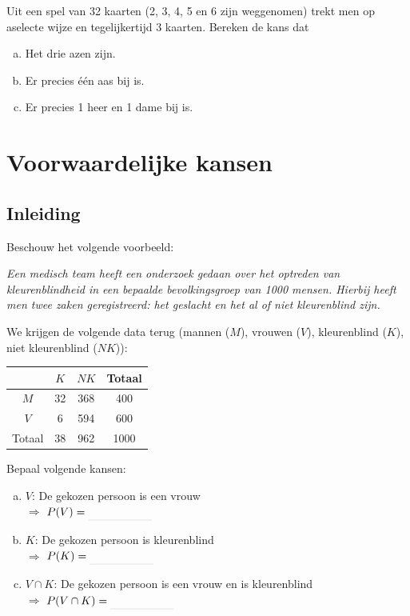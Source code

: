 \documentclass[12pt,twoside]{article}
\begin{document}
\begin{oefening}
Uit een spel van 32 kaarten (2, 3, 4, 5 en 6 zijn weggenomen) trekt men op aselecte wijze en tegelijkertijd 3 kaarten. Bereken de kans dat
\begin{enumerate}[(a)]
  \item Het drie azen zijn.
  \item Er precies één aas bij is.
  \item Er precies 1 heer en 1 dame bij is.
\end{enumerate}
\end{oefening}

\section{Voorwaardelijke kansen}

\subsection{Inleiding}

Beschouw het volgende voorbeeld:

{\em Een medisch team heeft een onderzoek gedaan over het optreden van kleurenblindheid in een bepaalde bevolkingsgroep van 1000 mensen. Hierbij heeft men twee zaken geregistreerd: het geslacht en het al of niet kleurenblind zijn.}

We krijgen de volgende data terug (mannen ($M$), vrouwen ($V$), kleurenblind ($K$), niet kleurenblind ($NK$)):

\begin{center}
  \begin{tabular}{c|c|c|c}
         &  $K$ &  $NK$ & Totaal\\
  \hline
  $M$      & 32 & 368 & 400\\
  $V$      &  6 & 594 & 600\\
  \hline
  Totaal & 38 & 962 & 1000
  \end{tabular}
\end{center}

\begin{oefening}
Bepaal volgende kansen:
\begin{enumerate}[(a)]
  \item $V$: De gekozen persoon is een vrouw\\$\Rightarrow$ $P(V)=\arule{2cm}$
  \item $K$: De gekozen persoon is kleurenblind\\$\Rightarrow$ $P(K)=\arule{2cm}$
  \item $V\cap K$: De gekozen persoon is een vrouw en is kleurenblind\\$\Rightarrow$ $P(V\cap K)=\arule{2cm}$
\end{enumerate}
\end{oefening}
\end{document}
